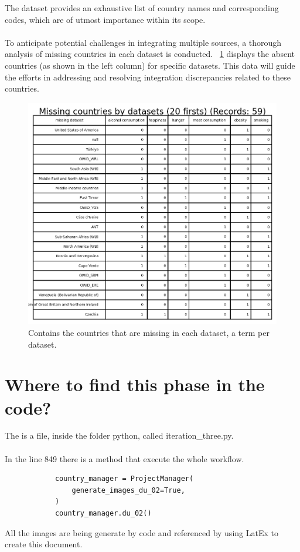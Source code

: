             The dataset provides an exhaustive list of country names and corresponding codes, which are of utmost
            importance within its scope.
            \\
            \\
            To anticipate potential challenges in integrating multiple sources, a thorough analysis of missing countries
            in each dataset is conducted. \figurename~\ref{fig:du-missing-countries-per-datasets-head-20} displays
            the absent countries (as shown in the left column) for specific datasets. This data will guide the efforts
            in addressing and resolving integration discrepancies related to these countries.
            \begin{figure}[H]
                \centering
                \includegraphics[scale=1.3]{images/du_missing_countries_per_dataset_head_20}
                \caption{Contains the countries that are missing in each dataset, a term per dataset.}
                \label{fig:du-missing-countries-per-datasets-head-20}
            \end{figure}


    \section{Where to find this phase in the code?}

        The is a file, inside the folder python, called iteration\_three.py.
        \\
        \\
        In the line 849 there is a method that execute the whole workflow.

        \begin{verbatim}
            country_manager = ProjectManager(
                generate_images_du_02=True,
            )
            country_manager.du_02()
        \end{verbatim}

        All the images are being generate by code and referenced by using LatEx to create this document.